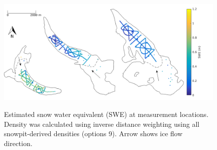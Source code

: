 \documentclass[12pt]{article}
\begin{document}
\begin{figure}[H]
	\centering
	\includegraphics[width =\textwidth]{SWEmap_opt9.png}\\
	\caption{Estimated snow water equivalent (SWE) at measurement locations. Density was calculated using inverse distance weighting using all snowpit-derived densities (options 9). Arrow shows ice flow direction.}
\end{figure}



\end{document}
